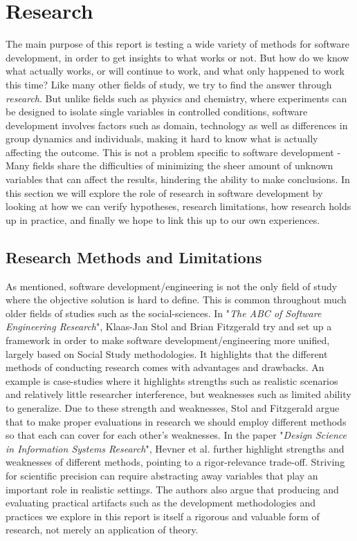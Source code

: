 \section{Research}

The main purpose of this report is testing a wide variety of methods for software development,
in order to get insights to what works or not.
But how do we know what actually works, or will continue to work, and what only happened to work this time?
Like many other fields of study, we try to find the answer through \textit{research}.
But unlike fields such as physics and chemistry, where experiments can be designed to
isolate single variables in controlled conditions, software development involves factors such as domain,
technology as well as differences in group dynamics and individuals,
making it hard to know what is actually affecting the outcome.
This is not a problem specific to software development - Many fields share the difficulties of
minimizing the sheer amount of unknown variables that can affect the results, hindering the ability to make conclusions.
In this section we will explore the role of research in software development by looking at how we can verify hypotheses,
research limitations, how research holds up in practice, and finally we hope to link this up to our own experiences.

\subsection{Research Methods and Limitations}

As mentioned, software development/engineering is not the only field of study where the objective solution is hard to define.
This is common throughout much older fields of studies such as the social-sciences.
In "\textit{The ABC of Software Engineering Research}"\cite{ABC}, Klaas-Jan Stol and Brian
Fitzgerald try and set up a framework in order to make software development/engineering more unified,
largely based on Social Study methodologies.
It highlights that the different methods of conducting research comes with advantages and drawbacks.
An example is case-studies where it highlights strengths such as realistic scenarios and relatively
little researcher interference, but weaknesses such as limited ability to generalize.
Due to these strength and weaknesses, Stol and Fitzgerald argue that to make proper evaluations
in research we should employ different methods so that each can cover for each other's weaknesses.
In the paper "\textit{Design Science in Information Systems Research}"\cite{DesignScience}, Hevner et al.
further highlight strengths and weaknesses of different methods, pointing to a rigor-relevance trade-off.
Striving for scientific precision can require abstracting away variables that play an important role in realistic settings.
The authors also argue that producing and evaluating practical artifacts such as the development methodologies
and practices we explore in this report is itself a rigorous and valuable form of research, not merely an application of theory.

